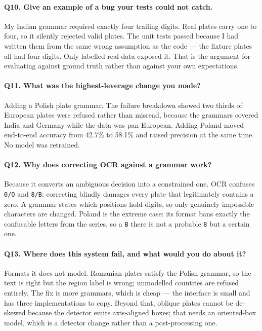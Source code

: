 \documentclass[11pt,a4paper]{article}
\begin{document}
\paragraph{Q10. Give an example of a bug your tests could not catch.}
My Indian grammar required exactly four trailing digits. Real plates carry one to
four, so it silently rejected valid plates. The unit tests passed because I had
written them from the same wrong assumption as the code --- the fixture plates
all had four digits. Only labelled real data exposed it. That is the argument for
evaluating against ground truth rather than against your own expectations.

\paragraph{Q11. What was the highest-leverage change you made?}
Adding a Polish plate grammar. The failure breakdown showed two thirds of
European plates were refused rather than misread, because the grammars covered
India and Germany while the data was pan-European. Adding Poland moved end-to-end
accuracy from 42.7\% to 58.1\% and raised precision at the same time. No model
was retrained.

\paragraph{Q12. Why does correcting OCR against a grammar work?}
Because it converts an ambiguous decision into a constrained one. OCR confuses
\texttt{0/O} and \texttt{8/B}; correcting blindly damages every plate that
legitimately contains a zero. A grammar states which positions hold digits, so
only genuinely impossible characters are changed. Poland is the extreme case: its
format bans exactly the confusable letters from the series, so a \texttt{B} there
is not a probable \texttt{8} but a certain one.

\paragraph{Q13. Where does this system fail, and what would you do about it?}
Formats it does not model. Romanian plates satisfy the Polish grammar, so the
text is right but the region label is wrong; unmodelled countries are refused
entirely. The fix is more grammars, which is cheap --- the interface is small and
has three implementations to copy. Beyond that, oblique plates cannot be
de-skewed because the detector emits axis-aligned boxes; that needs an
oriented-box model, which is a detector change rather than a post-processing one.
\end{document}
